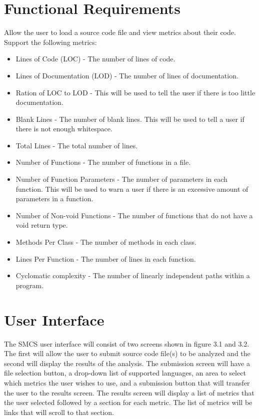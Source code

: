 \documentclass{scrreprt}
\begin{document}
	\section{Functional Requirements}
	Allow the user to load a source code file and view metrics about their code.\\
	Support the following metrics:
	\begin{itemize}
		\item Lines of Code (LOC) - The number of lines of code.
		\item Lines of Documentation (LOD) - The number of lines of documentation.
		\item Ration of LOC to LOD - This will be used to tell the user if there is too little documentation.
		\item Blank Lines - The number of blank lines. This will be used to tell a user if there is not enough whitespace.
		\item Total Lines - The total number of lines.
		\item Number of Functions - The number of functions in a file.
		\item Number of Function Parameters - The number of parameters in each function. This will be used to warn a user if there is an excessive amount of parameters in a function.
		\item Number of Non-void Functions - The number of functions that do not have a void return type.
		\item Methods Per Class - The number of methods in each class.
		\item Lines Per Function - The number of lines in each function.
		\item Cyclomatic complexity - The number of linearly independent paths within a program.
	\end{itemize}
	\section{User Interface}
	The SMCS user interface will consist of two screens shown in figure 3.1 and 3.2. The first will allow the user to submit source code file(s) to be analyzed and the second will display the results of the analysis. The submission screen will have a file selection button, a drop-down list of supported languages, an area to select which metrics the user wishes to use, and a submission button that will transfer the user to the results screen. The results screen will display a list of metrics that the user selected followed by a section for each metric. The list of metrics will be links that will scroll to that section.
	
\end{document}
